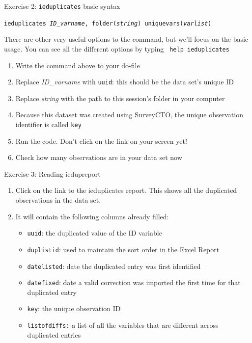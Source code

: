 \documentclass[aspectratio=169]{beamer}
\begin{document}
\begin{frame}{Exercise 2: \texttt{ieduplicates} basic syntax}
    \begin{center}
        \large
        \texttt{ieduplicates \textit{ID\_varname}, folder(\textit{string}) uniquevars(\textit{varlist})}    
    \end{center}    
There are other very useful options to the command, but we'll focus on the basic usage. You can see all the different options by typing \texttt{ help ieduplicates}

    \begin{enumerate}
        \item Write the command above to your do-file
        \item Replace \textit{ID\_varname} with \texttt{uuid}: this should be the data set's unique ID
        \item Replace \textit{string} with the path to this session's folder in your computer
        \item Because this dataset was created using SurveyCTO, the unique observation identifier is called \texttt{key}
        \item Run the code. Don't click on the link on your screen yet!
        \item Check how many observations are in your data set now
    \end{enumerate}
\end{frame}

\begin{frame}{Exercise 3: Reading iedupreport}
    \begin{enumerate}
        \item Click on the link to the ieduplicates report. This shows all the duplicated observations in the data set.
        \item It will contain the following columns already filled:
        \begin{itemize}
            \item \texttt{uuid}: the duplicated value of the ID variable
            \item \texttt{duplistid}: used to maintain the sort order in the Excel Report
            \item \texttt{datelisted}: date the duplicated entry was first identified
            \item \texttt{datefixed}: date a valid correction was imported the first time for that duplicated entry
            \item \texttt{key}: the unique observation ID
            \item \texttt{listofdiffs:} a list of all the variables that are different across duplicated entries
        \end{itemize}
    \end{enumerate}
\end{frame}
\end{document}
